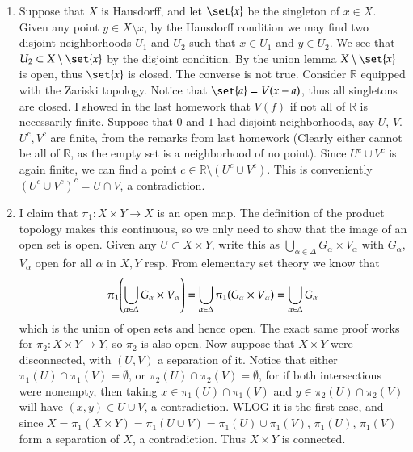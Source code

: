 \documentclass[12pt]{article}
\theoremstyle{definitionstyle}
\def\mbb#1{\mathbb{#1}}
\def \R{\mbb{R}}
\begin{document}
\begin{enumerate}[leftmargin=\labelsep]
		\item Suppose that $X$ is Hausdorff, and let $\set{x}$ be the singleton of $x \in X$. Given any point $y \in X \setminus {x}$, by the Hausdorff condition we may find two disjoint neighborhoods $U_1$ and $U_2$ such that $x \in U_1$ and $y \in U_2$. We see that $U_2 \subset X \setminus \set{x}$ by the disjoint condition. By the union lemma $X \setminus \set{x}$ is open, thus $\set{x}$ is closed. The converse is not true. Consider $\R$ equipped with the Zariski topology. Notice that $\set{a} = V(x-a)$, thus all singletons are closed. I showed in the last homework that $V(f)$ if not all of $\R$ is necessarily finite. Suppose that $0$ and $1$ had disjoint neighborhoods, say $U$, $V$. $U^c, V^c$ are finite, from the remarks from last homework (Clearly either cannot be all of $\R$, as the empty set is a neighborhood of no point). Since $U^c \cup V^c$ is again finite, we can find a point $c \in \R \setminus (U^c \cup V^c)$. This is conveniently $(U^c \cup V^c)^c = U \cap V$, a contradiction.
		
		\item I claim that $\pi_1: X \times Y \to X$ is an open map. The definition of the product topology makes this continuous, so we only need to show that the image of an open set is open. Given any $U \subset X \times Y$, write this as $\bigcup_{\alpha \in \Delta} G_\alpha \times V_\alpha$ with $G_\alpha$, $V_\alpha$ open for all $\alpha$ in $X, Y$ resp. From elementary set theory we know that 
		\begin{align*}
			\pi_1\qty(\bigcup_{\alpha \in \Delta} G_\alpha \times V_\alpha) = \bigcup_{\alpha \in \Delta} \pi_1(G_\alpha \times V_\alpha) = \bigcup_{\alpha \in \Delta} G_\alpha
		\end{align*}
		which is the union of open sets and hence open. The exact same proof works for $\pi_2: X \times Y \to Y$, so $\pi_2$ is also open. Now suppose that $X \times Y$ were disconnected, with $(U, V)$ a separation of it. Notice that either $\pi_1(U) \cap \pi_1(V) = \emptyset$, or $\pi_2(U) \cap \pi_2(V) = \emptyset$, for if both intersections were nonempty, then taking $x \in \pi_1(U) \cap \pi_1(V)$ and $y \in \pi_2(U) \cap \pi_2(V)$ will have $(x, y) \in U \cup V$, a contradiction. WLOG it is the first case, and since $X = \pi_1(X \times Y) = \pi_1(U \cup V) = \pi_1(U) \cup \pi_1(V)$, $\pi_1(U)$, $\pi_1(V)$ form a separation of $X$, a contradiction. Thus $X \times Y$ is connected.
		

\end{enumerate}
\end{document}

